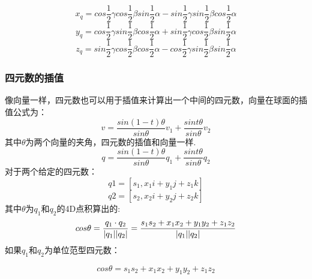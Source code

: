 \documentclass[a4paper,10pt]{article}
\begin{document}
\begin{CJK}{UTF8}{song}
\begin{displaymath}
x_{q}=cos\frac{1}{2}\gamma{}cos\frac{1}{2}\beta{}sin\frac{1}{2}\alpha-sin\frac{1}{2}\gamma{}sin\frac{1}{2}\beta{}cos\frac{1}{2}\alpha
\end{displaymath}
\begin{displaymath}
y_{q}=cos\frac{1}{2}\gamma{}sin\frac{1}{2}\beta{}cos\frac{1}{2}\alpha+sin\frac{1}{2}\gamma{}cos\frac{1}{2}\beta{}sin\frac{1}{2}\alpha
\end{displaymath}
\begin{displaymath}
z_{q}=sin\frac{1}{2}\gamma{}cos\frac{1}{2}\beta{}cos\frac{1}{2}\alpha-cos\frac{1}{2}\gamma{}sin\frac{1}{2}\beta{}sin\frac{1}{2}\alpha
\end{displaymath}

\subsubsection{四元数的插值}
像向量一样，四元数也可以用于插值来计算出一个中间的四元数，向量在球面的插值公式为：
\begin{displaymath}
 v=\frac{sin(1-t)\theta}{sin\theta}v_{1}+\frac{sin t\theta{}}{sin\theta}v_{2}
\end{displaymath}
其中$\theta$为两个向量的夹角，四元数的插值和向量一样.
\begin{displaymath}
 q=\frac{sin(1-t)\theta}{sin\theta}q_{1}+\frac{sin t\theta{}}{sin\theta}q_{2}
\end{displaymath}
对于两个给定的四元数：
\begin{displaymath}
 q1=[s_{1},x_{1}i+y_{1}j+z_{1}k]
\end{displaymath}
\begin{displaymath}
 q2=[s_{2},x_{2}i+y_{2}j+z_{2}k]
\end{displaymath}
其中$\theta$为$q_{1}$和$q_{2}$的4D点积算出的:
\begin{displaymath}
  cos\theta  = \frac{q_{1}\cdot{}q_{2}}{|q_{1}||q_{2}|} \\
             = \frac{s_{1}s_{2}+x_{1}x_{2}+y_{1}y_{2}+z_{1}z_{2}}{|q_{1}||q_{2}|}
\end{displaymath}
如果$q_{1}$和$q_{2}$为单位范型四元数：

\begin{displaymath}
cos\theta= s_{1}s_{2}+x_{1}x_{2}+y_{1}y_{2}+z_{1}z_{2}
\end{displaymath}


























\end{CJK}
\end{document}
